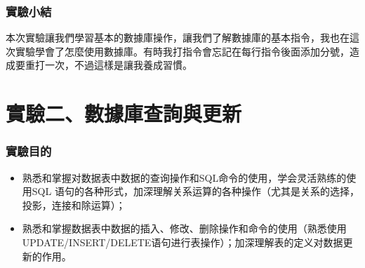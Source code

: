 \documentclass[12pt, a4paper]{report}
\begin{document}
\begin{figure}[H] %
    \centering %
\end{figure}

\section{實驗小結}

本次實驗讓我們學習基本的數據庫操作，讓我們了解數據庫的基本指令，我也在這次實驗學會了怎麼使用數據庫。有時我打指令會忘記在每行指令後面添加分號，造成要重打一次，不過這樣是讓我養成習慣。

\part{實驗二、數據庫查詢與更新}

\section{實驗目的}

\begin{itemize}
    \item 熟悉和掌握对数据表中数据的查询操作和SQL命令的使用，学会灵活熟练的使用SQL 语句的各种形式，加深理解关系运算的各种操作（尤其是关系的选择，投影，连接和除运算）；
    \item 熟悉和掌握数据表中数据的插入、修改、删除操作和命令的使用（熟悉使用UPDATE/INSERT/DELETE语句进行表操作）；加深理解表的定义对数据更新的作用。
\end{itemize}
\end{document}
